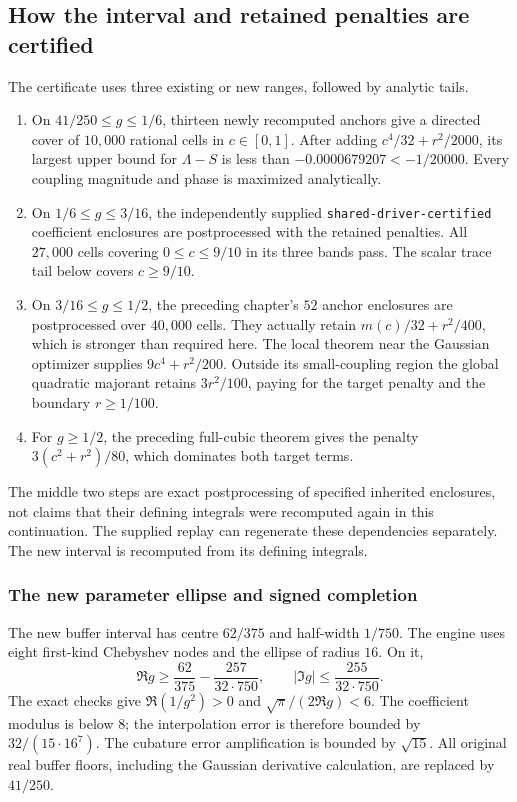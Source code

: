 \subsection{How the interval and retained penalties are certified}
The certificate uses three existing or new ranges, followed by
analytic tails.
\begin{enumerate}
\item On \(41/250\le g\le1/6\), thirteen newly recomputed anchors
give a directed cover of \(10{,}000\) rational cells in \(c\in[0,1]\).
After adding \(c^4/32+r^2/2000\), its largest upper bound for
\(\Lambda-S\) is less than \(-0.0000679207<-1/20000\).
Every coupling magnitude and phase is maximized analytically.
\item On \(1/6\le g\le3/16\), the independently supplied
\texttt{shared-driver-certified} coefficient enclosures are
postprocessed with the retained penalties. All \(27{,}000\) cells
covering \(0\le c\le9/10\) in its three bands pass. The scalar trace
tail below covers \(c\ge9/10\).
\item On \(3/16\le g\le1/2\), the preceding chapter's \(52\) anchor
enclosures are postprocessed over \(40{,}000\) cells. They actually
retain \(m(c)/32+r^2/400\), which is stronger than required here.
The local theorem near the Gaussian optimizer supplies
\(9c^4+r^2/200\). Outside its small-coupling region the global
quadratic majorant retains \(3r^2/100\), paying for the target
penalty and the boundary \(r\ge1/100\).
\item For \(g\ge1/2\), the preceding full-cubic theorem gives the
penalty \(3(c^2+r^2)/80\), which dominates both target terms.
\end{enumerate}

The middle two steps are exact postprocessing of specified inherited
enclosures, not claims that their defining integrals were recomputed
again in this continuation. The supplied replay can regenerate these
dependencies separately. The new interval is recomputed from its
defining integrals.

\subsubsection{The new parameter ellipse and signed completion}
The new buffer interval has centre \(62/375\) and half-width \(1/750\).
The engine uses eight first-kind Chebyshev nodes and the ellipse of
radius \(16\). On it,
\[
 \Re g\ge\frac{62}{375}-\frac{257}{32\cdot750},\qquad
 |\Im g|\le\frac{255}{32\cdot750}.
\]
The exact checks give \(\Re(1/g^2)>0\) and
\(\sqrt\pi/(2\Re g)<6\). The coefficient modulus is below \(8\);
the interpolation error is therefore bounded by
\(32/(15\cdot16^7)\). The cubature error amplification is bounded
by \(\sqrt{15}\). All original real buffer floors, including
the Gaussian derivative calculation, are replaced by \(41/250\).

